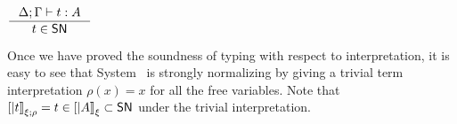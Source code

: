 \begin{corollary}
        $\inference{\Delta;\Gamma |- t : A}{t \in \SN}$
\end{corollary}
Once we have proved the soundness of typing with respect to interpretation,
it is easy to see that System \F\ is strongly normalizing by giving
a trivial term interpretation $\rho(x) = x$ for all the free variables.
Note that $[|t|]_{\xi;\rho} = t \in [|A|]_\xi \subset \mathsf{SN}$
under the trivial interpretation.

